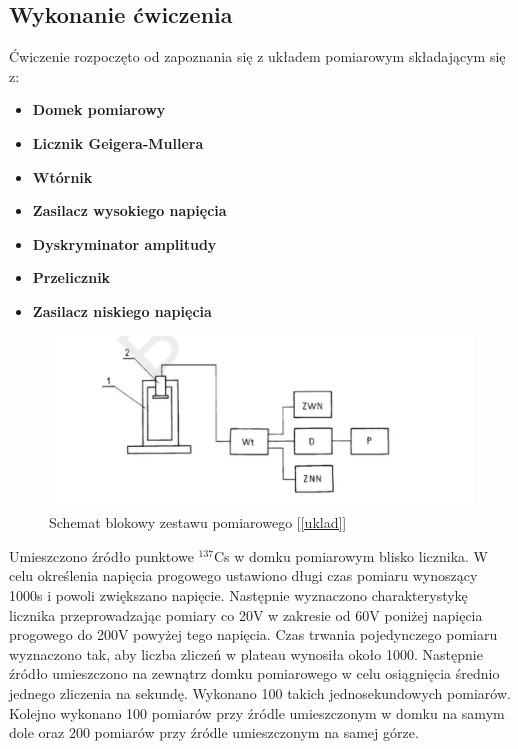 \documentclass{article}
\begin{document}
\subsection{Wykonanie ćwiczenia}
Ćwiczenie rozpoczęto od zapoznania się z układem pomiarowym składającym się z:
\begin{itemize}
	\item \textbf{Domek pomiarowy}
	\item \textbf{Licznik Geigera-Mullera}
	\item \textbf{Wtórnik}
	\item \textbf{Zasilacz wysokiego napięcia}
	\item \textbf{Dyskryminator amplitudy}
	\item \textbf{Przelicznik}
	\item \textbf{Zasilacz niskiego napięcia}
\end{itemize}
\begin{figure}[h!]
	\centering
	\includegraphics[width = 0.7\linewidth]{images/uklad}
	\caption{Schemat blokowy zestawu pomiarowego [\ref{uklad}]}
\end{figure}
Umieszczono źródło punktowe $^{137}$Cs w domku pomiarowym blisko licznika. W celu określenia napięcia progowego ustawiono długi czas pomiaru wynoszący 1000s i powoli zwiększano napięcie. Następnie wyznaczono charakterystykę licznika przeprowadzając pomiary co 20V w zakresie od 60V poniżej napięcia progowego do 200V powyżej tego napięcia. Czas trwania pojedynczego pomiaru wyznaczono tak, aby liczba zliczeń w plateau wynosiła około 1000. Następnie źródło umieszczono na zewnątrz domku pomiarowego w celu osiągnięcia średnio jednego zliczenia na sekundę. Wykonano 100 takich jednosekundowych pomiarów. Kolejno wykonano 100 pomiarów przy źródle umieszczonym w domku na samym dole oraz 200 pomiarów przy źródle umieszczonym na samej górze.
\newpage
\end{document}
